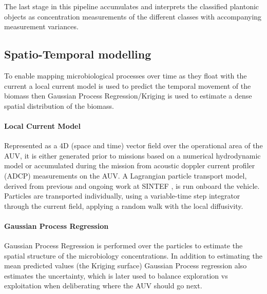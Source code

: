 \documentclass[conference]{IEEEtran}
\begin{document}
The last stage in this pipeline accumulates and interprets the classified plantonic objects as concentration measurements of the different classes with accompanying measurement variances.

\subsection{Spatio-Temporal modelling}
To enable mapping microbiological processes over time as they float with the current a local current model is used to predict the temporal movement of the biomass then Gaussian Process Regression/Kriging is used to estimate a dense spatial distribution of the biomass.

\paragraph{Local Current Model}
Represented as a 4D (space and time) vector field over the operational area of the AUV, it is either generated prior to missions based on a numerical hydrodynamic model
or accumulated during the mission from acoustic doppler current profiler (ADCP) measurements on the AUV.
A Lagrangian particle transport model, derived from previous and ongoing
work at SINTEF \cite{Rye2006}, is run onboard the vehicle.
Particles are transported individually, using a variable-time step
integrator %
through the current field, applying a random walk with the local diffusivity.

\paragraph{Gaussian Process Regression} 
Gaussian Process Regression is performed over the particles to estimate the spatial structure of the microbiology concentrations.
In addition to estimating the mean predicted values (the Kriging surface)
Gaussian Process regression also estimates the uncertainty, which is
later used to balance exploration vs exploitation when deliberating
where the AUV should go next.
\end{document}
